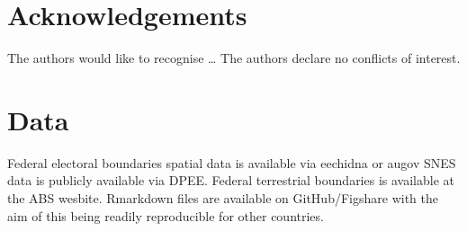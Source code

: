 \documentclass[a4paper,11pt]{article}
\begin{document}
\newpage
\section{Acknowledgements}
The authors would like to recognise \ldots
The authors declare no conflicts of interest.

\newpage
\section{Data}
Federal electoral boundaries spatial data is available via eechidna or augov
SNES data is publicly available via DPEE.
Federal terrestrial boundaries is available at the ABS wesbite.
Rmarkdown files are available on GitHub/Figshare with the aim of this being readily reproducible for other countries.
\end{document}
